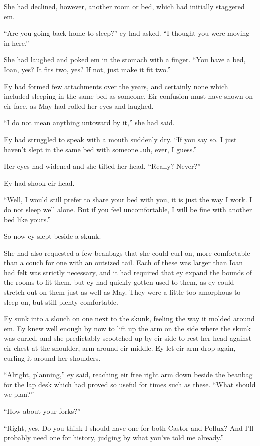 She had declined, however, another room or bed, which had initially staggered em.

``Are you going back home to sleep?'' ey had asked. ``I thought you were moving in here.''

She had laughed and poked em in the stomach with a finger. ``You have a bed, Ioan, yes? It fits two, yes? If not, just make it fit two.''

Ey had formed few attachments over the years, and certainly none which included sleeping in the same bed as someone. Eir confusion must have shown on eir face, as May had rolled her eyes and laughed.

``I do not mean anything untoward by it,'' she had said.

Ey had struggled to speak with a mouth suddenly dry. ``If you say so. I just haven't slept in the same bed with someone\ldots uh, ever, I guess.''

Her eyes had widened and she tilted her head. ``Really? Never?''

Ey had shook eir head.

``Well, I would still prefer to share your bed with you, it is just the way I work. I do not sleep well alone. But if you feel uncomfortable, I will be fine with another bed like yours.''

So now ey slept beside a skunk.

She had also requested a few beanbags that she could curl on, more comfortable than a couch for one with an outsized tail. Each of these was larger than Ioan had felt was strictly necessary, and it had required that ey expand the bounds of the rooms to fit them, but ey had quickly gotten used to them, as ey could stretch out on them just as well as May. They were a little too amorphous to sleep on, but still plenty comfortable.

Ey sunk into a slouch on one next to the skunk, feeling the way it molded around em. Ey knew well enough by now to lift up the arm on the side where the skunk was curled, and she predictably scootched up by eir side to rest her head against eir chest at the shoulder, arm around eir middle. Ey let eir arm drop again, curling it around her shoulders.

``Alright, planning,'' ey said, reaching eir free right arm down beside the beanbag for the lap desk which had proved so useful for times such as these. ``What should we plan?''

``How about your forks?''

``Right, yes. Do you think I should have one for both Castor and Pollux? And I'll probably need one for history, judging by what you've told me already.''

